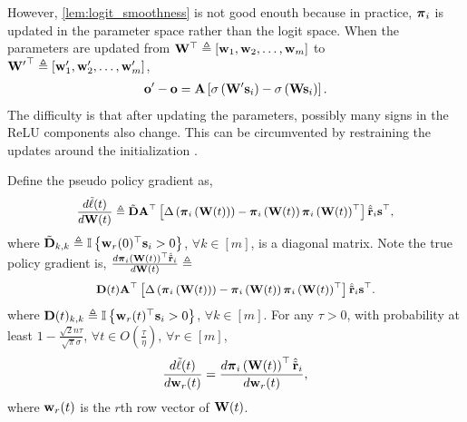 However, \cref{lem:logit_smoothness} is not good enouth because in practice, ${\boldsymbol{\pi}}_i$ is updated in the parameter space rather than the logit space. When the parameters are updated from ${\mathbf{W}}^\top \triangleq \left[ {\mathbf{w}}_1, {\mathbf{w}}_2, \dots, {\mathbf{w}}_m \right]$ to ${{\mathbf{W}}^\prime}^\top \triangleq \left[ {\mathbf{w}}_1^\prime, {\mathbf{w}}_2^\prime, \dots, {\mathbf{w}}_m^\prime \right]$,
\begin{equation*}
\begin{split}
    {\mathbf{o}}^\prime - {\mathbf{o}} = {\mathbf{A}} \left[ \sigma \left( {\mathbf{W}}^\prime {\mathbf{s}}_i \right) - \sigma \left( {\mathbf{W}} {\mathbf{s}}_i \right) \right].
\end{split}
\end{equation*}
The difficulty is that after updating the parameters, possibly many signs in the ReLU components also change. This can be circumvented by restraining the updates around the initialization \citep{li2018learning}.

\begin{lem}
\label{lem:gradient_coupling}
	Define the pseudo policy gradient as,
\begin{equation*}
\begin{split}
\small
	\frac{d \tilde{\ell}(t)}{d \rmW(t)} \triangleq \tilde{\rmD} \rmA^\top \left[ \Delta\left( \rvpi_i\left(\rmW(t)\right) \right) - \rvpi_i\left(\rmW(t)\right) \rvpi_i\left(\rmW(t)\right)^\top \right] \hat{\rvtilder}_i \rvs^\top,
\end{split}
\end{equation*}
where $\tilde{{\mathbf{D}}}_{k,k} \triangleq {\mathbb{I}}\left\{ {\mathbf{w}}_r(0)^\top {\mathbf{s}}_i > 0 \right\}$, $\forall k \in [m]$, is a diagonal matrix. Note the true policy gradient is, $\frac{d {\boldsymbol{\pi}}_i\left({\mathbf{W}}(t)\right)^\top \hat{{\tilde{\mathbf{r}}}}_i}{d {\mathbf{W}}(t)} \triangleq $
\begin{equation*}
\begin{split}
\small
    \rmD(t) \rmA^\top \left[ \Delta\left( \rvpi_i\left(\rmW(t)\right) \right) - \rvpi_i\left(\rmW(t)\right) \rvpi_i\left(\rmW(t)\right)^\top \right] \hat{\rvtilder}_i \rvs^\top.
\end{split}
\end{equation*}
where ${\mathbf{D}}(t)_{k,k} \triangleq {\mathbb{I}}\left\{ {\mathbf{w}}_r(t)^\top {\mathbf{s}}_i > 0 \right\}$, $\forall k \in [m]$. For any $\tau > 0$, with probability at least $1 - \frac{\sqrt{2}n\tau}{\sqrt{\pi}\sigma}$, $\forall t \in O\left(\frac{\tau}{\eta}\right)$, $\forall r \in [m]$,
\begin{equation*}
	\frac{d\tilde{\ell}(t)}{d {\mathbf{w}}_r(t)} = \frac{d {\boldsymbol{\pi}}_i\left({\mathbf{W}}(t)\right)^\top \hat{{\tilde{\mathbf{r}}}}_i}{d {\mathbf{w}}_r(t)},
\end{equation*}
where ${\mathbf{w}}_r(t)$ is the $r$th row vector of ${\mathbf{W}}(t)$.
\end{lem}

